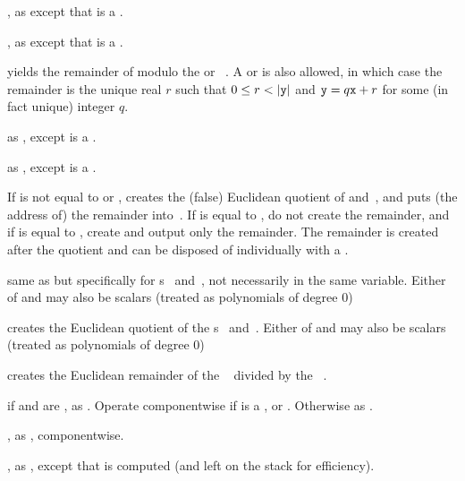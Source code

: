 , as 
except that  is a .

, as 
except that  is a .

 yields the remainder of 
modulo the  or ~. A  or  
is also allowed, in which case the remainder is the unique real $r$ such that
$0 \leq r < |{\tt y}|$ and ${\tt y} = q{\tt x} + r$ for some (in fact unique)
integer $q$.

 as , except  is
a .

 as , except  is
a .

 If  is not equal to
 or , creates the (false) Euclidean quotient of
 and~, and puts (the address of) the remainder into~.
If  is equal to , do not create the remainder, and if
 is equal to , create and output only the remainder.
The remainder is created after the quotient and can be disposed of
individually with a .

 same as  but
specifically for s~ and~, not necessarily in the same
variable. Either of  and  may also be scalars (treated as
polynomials of degree $0$)

 creates the Euclidean quotient of the
s~ and~. Either of  and  may also be
scalars (treated as polynomials of degree $0$)

 creates the Euclidean remainder of the
~ divided by the ~.

 if  and  are ,
as . Operate componentwise if  is
a ,  or . Otherwise as .

, as ,
componentwise.

, as , except that
 is computed (and left on the stack for efficiency).

